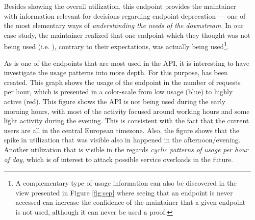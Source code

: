\documentclass[conference]{IEEEtran}
\begin{document}

Besides showing the overall utilization, this endpoint provides the maintainer with information relevant for decisions regarding endpoint deprecation --- one of the most elementary ways of {\em understanding the needs of the downstream}\cite{Haen14a}. In our case study, the maintainer realized that one endpoint which they thought was not being used (i.e. ), contrary to their expectations, was actually being used\footnote{A complementary type of usage information can also be discovered in the view presented in Figure \ref{fig:sep} where seeing that an endpoint is never accessed can increase the confidence of the maintainer that a given endpoint is not used, although it can never be used a proof.}.


As \epOutcome is one of the endpoints that are most used in the API, it is interesting to have investigate the usage patterns into more depth. For this purpose,  has been created. This graph shows the usage of the endpoint in the number of requests per hour, which is presented in a color-scale from low usage (blue) to highly active (red). This figure shows the API is not being used during the early morning hours, with most of the activity focused around working hours and some light activity during the evening. This is consistent with the fact that the current users are all in the central European timezone. Also, the figure shows that the spike in utilization that was visible also in  happened in the afternoon/evening. Another utilization that is visible in the  regards {\em cyclic patterns of usage per hour of day}, which is of interest to attack possible service overloads in the future.



\end{document}
